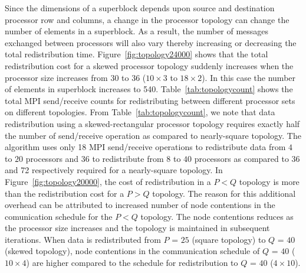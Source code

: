 \documentclass[letterpaper]{llncs}
\begin{document}
\vspace{-0.03in}
Since the dimensions of a superblock depends upon source and destination processor row and columns, a change in the processor topology can change the number of elements in a superblock. As a result, the number of messages exchanged between processors will also vary thereby increasing or decreasing
the total redistribution time. 
Figure~\ref{fig:topology24000} shows that the total redistribution cost for a skewed processor topology suddenly increases 
when the processor size increases from 30 to 36 ($10 \times 3$ to $18 \times 2$).
In this case the number of elements in superblock increases to 540.
Table~\ref{tab:topologycount}  shows the total MPI send/receive counts for redistributing between different processor sets on different topologies. 
From Table~\ref{tab:topologycount},
we note that data redistribution using a skewed-rectangular processor topology 
requires exactly half the number of send/receive operation as compared to 
nearly-square 
topology. The algorithm uses only 18 MPI send/receive operations to 
redistribute data from $4$ to  $20$ processors and 36 to redistribute from 
$8$ to $40$ processors as compared to 36 and 72 respectively required 
for a nearly-square topology.
In Figure~\ref{fig:topology20000}, the cost of redistribution in a  $P < Q$ topology is more than the redistribution cost for a $P > Q$ topology. The reason for this additional overhead can be attributed to increased number of node contentions in the comunication schedule for the $P < Q$ topology.  
The node contentions reduces as the processor size increases and the topology is maintained in subsequent iterations. When data is redistributed from $P$ = $25$ (square topology) to $Q$ = $40$ (skewed topology), 
 node contentions in the communication schedule of $Q$ = $40$ ($10\times 4$) are higher compared to the schedule for redistribution to $Q$ = $40$ ($4\times 10$).
\end{document}
